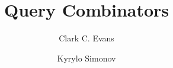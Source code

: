 \documentclass[9pt,twocolumn]{extproc}
\begin{document}
\title{Query Combinators}

\author{Clark C. Evans}
\author{Kyrylo Simonov}

\pagestyle{plain}
\thispagestyle{empty}

\maketitle












\end{document}
